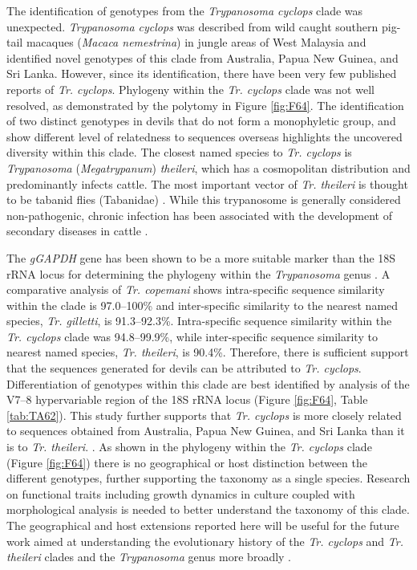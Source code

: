 \documentclass[a4paper, nobind]{templates/ociamthesis}
\begin{document}
The identification of genotypes from the \emph{Trypanosoma cyclops} clade was unexpected. \emph{Trypanosoma cyclops} was described from wild caught southern pig-tail macaques (\emph{Macaca nemestrina}) in jungle areas of West Malaysia \autocite{weinmanTrypanosomaCyclopsSp1972} and \textcite{hamiltonNewLineageTrypanosomes2005} identified novel genotypes of this clade from Australia, Papua New Guinea, and Sri Lanka. However, since its identification, there have been very few published reports of \emph{Tr. cyclops}. Phylogeny within the \emph{Tr. cyclops} clade was not well resolved, as demonstrated by the polytomy in Figure \ref{fig:F64}. The identification of two distinct genotypes in devils that do not form a monophyletic group, and show different level of relatedness to sequences overseas highlights the uncovered diversity within this clade. The closest named species to \emph{Tr. cyclops} is \emph{Trypanosoma} (\emph{Megatrypanum}) \emph{theileri}, which has a cosmopolitan distribution and predominantly infects cattle. The most important vector of \emph{Tr. theileri} is thought to be tabanid flies (Tabanidae) \autocite{hoareTrypanosomesMammalsZoological1972,werszkoMolecularDetectionMegatrypanum2020}. While this trypanosome is generally considered non-pathogenic, chronic infection has been associated with the development of secondary diseases in cattle \autocite{rodriguesCharacterizationSplicedLeader2010}.

The \emph{gGAPDH} gene has been shown to be a more suitable marker than the 18S rRNA locus for determining the phylogeny within the \emph{Trypanosoma} genus \autocite{hamiltonTrypanosomesAreMonophyletic2004}. A comparative analysis of \emph{Tr. copemani} shows intra-specific sequence similarity within the clade is 97.0--100\% and inter-specific similarity to the nearest named species, \emph{Tr. gilletti}, is 91.3--92.3\%. Intra-specific sequence similarity within the \emph{Tr. cyclops} clade was 94.8--99.9\%, while inter-specific sequence similarity to nearest named species, \emph{Tr. theileri}, is 90.4\%. Therefore, there is sufficient support that the sequences generated for devils can be attributed to \emph{Tr. cyclops}. Differentiation of genotypes within this clade are best identified by analysis of the V7--8 hypervariable region of the 18S rRNA locus (Figure \ref{fig:F64}, Table \ref{tab:TA62}). This study further supports that \emph{Tr. cyclops} is more closely related to sequences obtained from Australia, Papua New Guinea, and Sri Lanka than it is to \emph{Tr. theileri}. \autocite{hamiltonNewLineageTrypanosomes2005}. As shown in the phylogeny within the \emph{Tr. cyclops} clade (Figure \ref{fig:F64}) there is no geographical or host distinction between the different genotypes, further supporting the taxonomy as a single species. Research on functional traits including growth dynamics in culture coupled with morphological analysis is needed to better understand the taxonomy of this clade. The geographical and host extensions reported here will be useful for the future work aimed at understanding the evolutionary history of the \emph{Tr. cyclops} and \emph{Tr. theileri} clades and the \emph{Trypanosoma} genus more broadly \autocite{hamiltonEvolutionTrypanosomaCruzi2012}.
\end{document}
